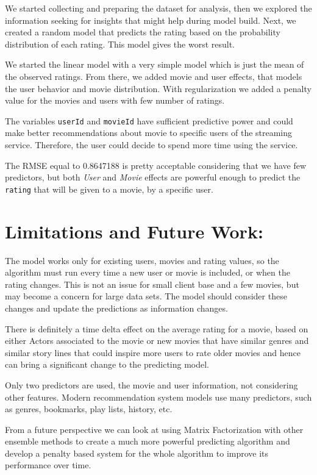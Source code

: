 \documentclass[
]{article}
\begin{document}
We started collecting and preparing the dataset for analysis, then we
explored the information seeking for insights that might help during
model build. Next, we created a random model that predicts the rating
based on the probability distribution of each rating. This model gives
the worst result.

We started the linear model with a very simple model which is just the
mean of the observed ratings. From there, we added movie and user
effects, that models the user behavior and movie distribution. With
regularization we added a penalty value for the movies and users with
few number of ratings.

The variables \texttt{userId} and \texttt{movieId} have sufficient
predictive power and could make better recommendations about movie to
specific users of the streaming service. Therefore, the user could
decide to spend more time using the service.

The RMSE equal to 0.8647188 is pretty acceptable considering that we
have few predictors, but both \emph{User} and \emph{Movie} effects are
powerful enough to predict the \texttt{rating} that will be given to a
movie, by a specific user.

\hypertarget{limitations-and-future-work}{%
\section{\texorpdfstring{\textbf{Limitations and Future
Work:}}{Limitations and Future Work:}}\label{limitations-and-future-work}}

The model works only for existing users, movies and rating values, so
the algorithm must run every time a new user or movie is included, or
when the rating changes. This is not an issue for small client base and
a few movies, but may become a concern for large data sets. The model
should consider these changes and update the predictions as information
changes.

There is definitely a time delta effect on the average rating for a
movie, based on either Actors associated to the movie or new movies that
have similar genres and similar story lines that could inspire more
users to rate older movies and hence can bring a significant change to
the predicting model.

Only two predictors are used, the movie and user information, not
considering other features. Modern recommendation system models use many
predictors, such as genres, bookmarks, play lists, history, etc.

From a future perspective we can look at using Matrix Factorization with
other ensemble methods to create a much more powerful predicting
algorithm and develop a penalty based system for the whole algorithm to
improve its performance over time.
\end{document}

